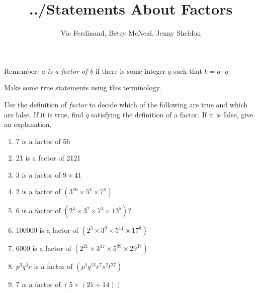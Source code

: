 \documentclass[nooutcomes]{ximera}
\title{../Statements About Factors}
\author{Vic Ferdinand, Betsy McNeal, Jenny Sheldon}
\begin{document}
\begin{abstract} \end{abstract}
\maketitle




Remember, \emph{a is a factor of b} if there is some integer $q$ such that $b = a \cdot q$.
\begin{problem}
 Make some true statements using this terminology.
\end{problem}

\begin{problem}
Use the definition of \emph{factor} to decide which of the following are true and which are false. If it is true, find $q$ satisfying the definition of a factor. If it is false, give an explanation.

\begin{enumerate}
\item 7 is a factor of 56 
\item \label{Statementsb} 21 is a factor of 2121
\item \label{Statementsc} 3 is a factor of $9 \times 41$
\item \label{Statementsd} 2 is a factor of $(3^{16} \times 5^4 \times 7^8)$
\item \label{Statementse} 6 is a factor of $(2^4 \times 3^2 \times 7^3 \times 13^5)$?
\item \label{Statementsf} 100000 is a factor of  $(2^3 \times 3^9 \times 5^{11} \times17^8)$
\item \label{Statementsg} 6000  is a factor of  $(2^{21} \times 3^{17} \times 5^{89} \times 29^{37})$
\item \label{Statementsh} $p^3q^5r$  is a factor of $(p^5q^{13}r^7s^2t^{27}) $
\item \label{Statementsi} 7 is a factor of $(5 \times (21+14))$
\end{enumerate}
\end{problem}
\end{document}
